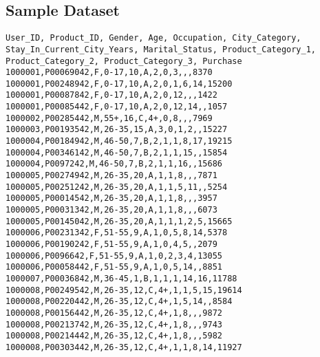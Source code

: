 \documentclass[paper=letter, fontsize=12pt]{article}
\begin{document}
\subsection{Sample Dataset}
\begin{verbatim}
User_ID, Product_ID, Gender, Age, Occupation, City_Category, Stay_In_Current_City_Years, Marital_Status, Product_Category_1, Product_Category_2, Product_Category_3, Purchase
1000001,P00069042,F,0-17,10,A,2,0,3,,,8370
1000001,P00248942,F,0-17,10,A,2,0,1,6,14,15200
1000001,P00087842,F,0-17,10,A,2,0,12,,,1422
1000001,P00085442,F,0-17,10,A,2,0,12,14,,1057
1000002,P00285442,M,55+,16,C,4+,0,8,,,7969
1000003,P00193542,M,26-35,15,A,3,0,1,2,,15227
1000004,P00184942,M,46-50,7,B,2,1,1,8,17,19215
1000004,P00346142,M,46-50,7,B,2,1,1,15,,15854
1000004,P0097242,M,46-50,7,B,2,1,1,16,,15686
1000005,P00274942,M,26-35,20,A,1,1,8,,,7871
1000005,P00251242,M,26-35,20,A,1,1,5,11,,5254
1000005,P00014542,M,26-35,20,A,1,1,8,,,3957
1000005,P00031342,M,26-35,20,A,1,1,8,,,6073
1000005,P00145042,M,26-35,20,A,1,1,1,2,5,15665
1000006,P00231342,F,51-55,9,A,1,0,5,8,14,5378
1000006,P00190242,F,51-55,9,A,1,0,4,5,,2079
1000006,P0096642,F,51-55,9,A,1,0,2,3,4,13055
1000006,P00058442,F,51-55,9,A,1,0,5,14,,8851
1000007,P00036842,M,36-45,1,B,1,1,1,14,16,11788
1000008,P00249542,M,26-35,12,C,4+,1,1,5,15,19614
1000008,P00220442,M,26-35,12,C,4+,1,5,14,,8584
1000008,P00156442,M,26-35,12,C,4+,1,8,,,9872
1000008,P00213742,M,26-35,12,C,4+,1,8,,,9743
1000008,P00214442,M,26-35,12,C,4+,1,8,,,5982
1000008,P00303442,M,26-35,12,C,4+,1,1,8,14,11927
\end{verbatim}
\end{document}
